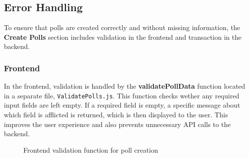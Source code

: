 \documentclass[a4paper,12pt]{report}
\begin{document}
\subsection{Error Handling}
To ensure that polls are created correctly and without missing information, the \textbf{Create Polls} section includes validation in the frontend and transaction in the backend.
\subsubsection{Frontend}
In the frontend, validation is handled by the \textbf{validatePollData} function located in a separate file, \texttt{ValidatePolls.js}. This function checks wether any required input fields are left empty. If a required field is empty, a specific message about which field is afflicted is returned, which is then displayed to the user. This improves the user experience and also prevents unnecessary API calls to the backend.
\begin{figure}[H]
	\caption{Frontend validation function for poll creation}
	\label{fig:validate-poll-data}
\end{figure}
\end{document}
